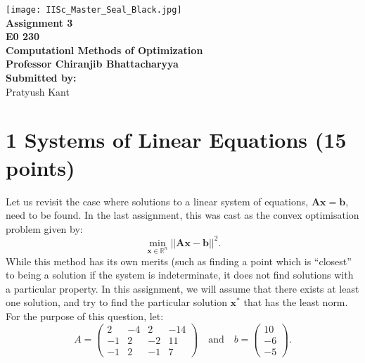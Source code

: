 \documentclass[12pt,a4paper]{article}
\newcommand{\R}{\mathbb{R}}
\theoremstyle{remark}
\begin{document}
\begin{titlepage}
    \centering
    \vspace*{2cm}  %

    \texttt{[image: IISc\_Master\_Seal\_Black.jpg]}\\[1cm]

     \Huge\textbf{Assignment 3}\\[0.5cm]
    \Huge\textbf{E0 230}\\[0.5cm]
    \LARGE\textbf{Computationl Methods of Optimization}\\[1cm]

    \Large\textbf{Professor Chiranjib Bhattacharyya}\\[0.5cm]

    \Large\textbf{Submitted by:}\\[0.5cm]
    \Large Pratyush Kant\\[0.5cm]
\end{titlepage}

\section*{1 Systems of Linear Equations (15 points)}

Let us revisit the case where solutions to a linear system of equations, $\mathbf{Ax = b}$, need to be found. In the last assignment, this was cast as the convex optimisation problem given by: $$\min_{\mathbf{x} \in \R^n} ||\mathbf{Ax - b}||^2.$$ While this method has its own merits (such as finding a point which is \enquote{closest} to being a solution if the system is indeterminate, it does not find solutions with a particular property. In this assignment, we will assume that there exists at least one solution, and try to find the particular solution $\mathbf{x}^*$ that has the least norm. For the purpose of this question, let: \[A = \begin{pmatrix}
    2 & -4 & 2 & -14\\
    -1 & 2 & -2 & 11\\
    -1 & 2 & -1 & 7
\end{pmatrix} \quad \text{and} \quad b = \begin{pmatrix}
    10\\
    -6\\
    -5
\end{pmatrix}.\]
\end{document}
